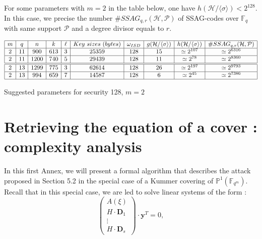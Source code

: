 \documentclass[10pt]{article}
\newcommand{\s}{\vspace{0.3cm}}
\newcommand{\cd}{\cdot}
\newcommand{\PP}{\mathbb{P}}
\newcommand{\calH}{\mathcal{H}}
\newcommand{\fqm}{\mathbb{F}_{q^m}}
\newcommand{\fq}{\mathbb{F}_q}
\newcommand{\w}{\omega}
\newcommand{\PR}{\mathcal{P}}
\begin{document}
\s

For some parameters with $m=2$ in the table below, one have $h(\calH/\langle \sigma \rangle) < 2^{128}$. In this case, we precise the number $\#SSAG_{q,r}(\mathcal{H},\PR)$ of SSAG-codes over $\fq$ with same support $\PR$ and a degree divisor equals to $r$.

\s


\begin{table}[htbp]
\begin{equation*}
\begin{array}{|c|c|c|c|c|c|c|c|c|c|}
\hline
m & q  & n & k & \ell & Key \ sizes \ (bytes) & \w_{ISD} & g(\calH/\langle \sigma \rangle) & h(\calH/\langle \sigma \rangle) & \#SSAG_{q,r}(\mathcal{H},\PR)  \\
\hline
2 & 11  & 900 & 613 & 3 & 25359 & 128 & 15 & \simeq 2^{107} & \simeq 2^{6316} \\
\hline
2 & 11  & 1200 & 740 & 5 & 29439 & 128 & 11 & \simeq 2^{78} & \simeq 2^{8360}\\
\hline \hline
2 & 13  & 1299 & 775 & 3 & 62614 & 128 & 26 & \simeq 2^{197} & \simeq 2^{9793}\\
\hline
2 & 13 & 994 & 659 & 7 & 14587 & 128 & 6 & \simeq 2^{45} & \simeq 2^{7386}\\
\hline
\end{array}
\end{equation*}
\caption{Suggested parameters for security 128, $m = 2$}
\end{table}


\newpage

\appendix

\section{Retrieving the equation of a cover : complexity analysis}

\s

In this first Annex, we will present a formal algorithm that describes the attack proposed in Section 5.2 in the special case of a Kummer covering of $\PP^1(\fqm)$. Recall that in this special case, we are led to solve linear systems of the form :
\begin{equation} \tag{$\Delta(\xi)$}
\begin{pmatrix}
A(\xi) \\
H \cd \textbf{D}_1 \\
\vdots \\
H \cd \textbf{D}_s
\end{pmatrix}
\cd \textbf{y}^T = 0,
\end{equation}
\s
\end{document}
